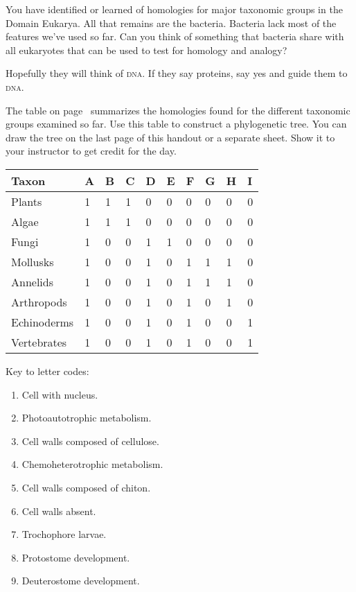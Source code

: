 \documentclass[12pt, hidelinks]{exam}
\newcommand*\AnswerBox[2]{%
    \parbox[t][#1]{0.92\textwidth}{%
    \begin{solution}#2\end{solution}}
    \vspace{\stretch{1}}
}
\begin{document}
\begin{questions}
\question
You have identified or learned of homologies for major taxonomic groups in the Domain Eukarya. All that remains are the bacteria. Bacteria lack most of the features we've used so far. Can you think of something that bacteria share with all eukaryotes that can be used to test for homology and analogy?

\AnswerBox{2\baselineskip}{Hopefully they will think of \textsc{dna}. If they say proteins, say yes and guide them to \textsc{dna.}}

\question[Checkout]
The table on page~\pageref{presence_table} summarizes the homologies found for the different taxonomic groups examined so far. Use this table to construct a phylogenetic tree. You can draw the tree on the last page of this handout or a separate sheet. Show it to your instructor to get credit for the day.


\end{questions}

\newpage

\begin{longtable}{@{}L{1in}L{0.25in}L{0.25in}L{0.25in}L{0.25in}L{0.25in}L{0.25in}L{0.25in}L{0.25in}L{0.25in}@{}}
\toprule
Taxon			&	A	&	B	&	C	&	D	&	E	&	F	&	G	&	H	&	I	\tabularnewline
\midrule
Plants			&	1	&	1	&	1	&	0	&	0	&	0	&	0	&	0	&	0	\tabularnewline
Algae			&	1	&	1	&	1	&	0	&	0	&	0	&	0	&	0	&	0	\tabularnewline
Fungi			&	1	&	0	&	0	&	1	&	1	&	0	&	0	&	0	&	0	\tabularnewline
Mollusks		&	1	&	0	&	0	&	1	&	0	&	1	&	1	&	1	&	0	\tabularnewline
Annelids		&	1	&	0	&	0	&	1	&	0	&	1	&	1	&	1	&	0	\tabularnewline
Arthropods	&	1	&	0	&	0	&	1	&	0	&	1	&	0	&	1	&	0	\tabularnewline
Echinoderms	&	1	&	0	&	0	&	1	&	0	&	1	&	0	&	0	&	1	\tabularnewline
Vertebrates	&	1	&	0	&	0	&	1	&	0	&	1	&	0	&	0	&	1	\tabularnewline
\bottomrule
\end{longtable}\label{presence_table}

Key to letter codes:

\begin{multicols}{2}
	\raggedcolumns
	\begin{enumerate}
		\item Cell with nucleus.
		\item Photoautotrophic metabolism.
		\item Cell walls composed of cellulose.
		\item Chemoheterotrophic metabolism.
		\item Cell walls composed of chiton.
		\item Cell walls absent.
		\item Trochophore larvae.
		\item Protostome development.
		\item Deuterostome development.
	\end{enumerate}
\end{multicols}
\end{document}

